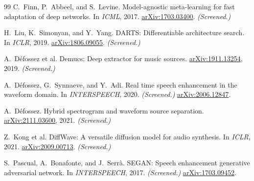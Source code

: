 \documentclass[10pt,twocolumn,letterpaper]{article}
\begin{document}
{\begin{thebibliography}{99}
C.~Finn, P.~Abbeel, and S.~Levine.
\newblock Model-agnostic meta-learning for fast adaptation of deep networks.
\newblock In \emph{ICML}, 2017.
\newblock \href{https://arxiv.org/abs/1703.03400}{arXiv:1703.03400}. \textit{(Screened.)}

H.~Liu, K.~Simonyan, and Y.~Yang.
\newblock DARTS: Differentiable architecture search.
\newblock In \emph{ICLR}, 2019.
\newblock \href{https://arxiv.org/abs/1806.09055}{arXiv:1806.09055}. \textit{(Screened.)}

A.~D\'efossez et al.
\newblock Demucs: Deep extractor for music sources.
\newblock \href{https://arxiv.org/abs/1911.13254}{arXiv:1911.13254}, 2019. \textit{(Screened.)}

A.~D\'efossez, G.~Synnaeve, and Y.~Adi.
\newblock Real time speech enhancement in the waveform domain.
\newblock In \emph{INTERSPEECH}, 2020. \textit{(Screened.)}
\newblock \href{https://arxiv.org/abs/2006.12847}{arXiv:2006.12847}.

A.~D\'efossez.
\newblock Hybrid spectrogram and waveform source separation.
\newblock \href{https://arxiv.org/abs/2111.03600}{arXiv:2111.03600}, 2021. \textit{(Screened.)}

Z.~Kong et al.
\newblock DiffWave: A versatile diffusion model for audio synthesis.
\newblock In \emph{ICLR}, 2021.
\newblock \href{https://arxiv.org/abs/2009.00713}{arXiv:2009.00713}. \textit{(Screened.)}

S.~Pascual, A.~Bonafonte, and J.~Serr\`a.
\newblock SEGAN: Speech enhancement generative adversarial network.
\newblock In \emph{INTERSPEECH}, 2017. \textit{(Screened.)}
\newblock \href{https://arxiv.org/abs/1703.09452}{arXiv:1703.09452}.

\end{thebibliography}
}
\end{document}
